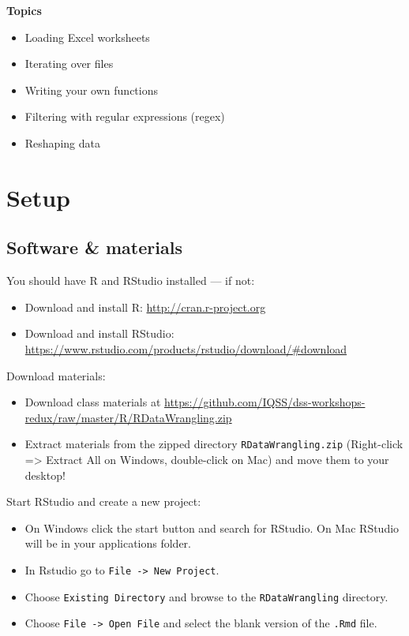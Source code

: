 \documentclass[]{book}
\providecommand{\tightlist}{%
  \setlength{\itemsep}{0pt}\setlength{\parskip}{0pt}}
\begin{document}
\textbf{Topics}

\begin{itemize}
\tightlist
\item
  Loading Excel worksheets
\item
  Iterating over files
\item
  Writing your own functions
\item
  Filtering with regular expressions (regex)
\item
  Reshaping data
\end{itemize}

\section{Setup}\label{setup-3}

\subsection{Software \& materials}\label{software-materials-3}

You should have R and RStudio installed --- if not:

\begin{itemize}
\tightlist
\item
  Download and install R: \url{http://cran.r-project.org}
\item
  Download and install RStudio:
  \url{https://www.rstudio.com/products/rstudio/download/\#download}
\end{itemize}

Download materials:

\begin{itemize}
\tightlist
\item
  Download class materials at
  \url{https://github.com/IQSS/dss-workshops-redux/raw/master/R/RDataWrangling.zip}
\item
  Extract materials from the zipped directory
  \texttt{RDataWrangling.zip} (Right-click =\textgreater{} Extract All
  on Windows, double-click on Mac) and move them to your desktop!
\end{itemize}

Start RStudio and create a new project:

\begin{itemize}
\tightlist
\item
  On Windows click the start button and search for RStudio. On Mac
  RStudio will be in your applications folder.
\item
  In Rstudio go to \texttt{File\ -\textgreater{}\ New\ Project}.
\item
  Choose \texttt{Existing\ Directory} and browse to the
  \texttt{RDataWrangling} directory.
\item
  Choose \texttt{File\ -\textgreater{}\ Open\ File} and select the blank
  version of the \texttt{.Rmd} file.
\end{itemize}
\end{document}
